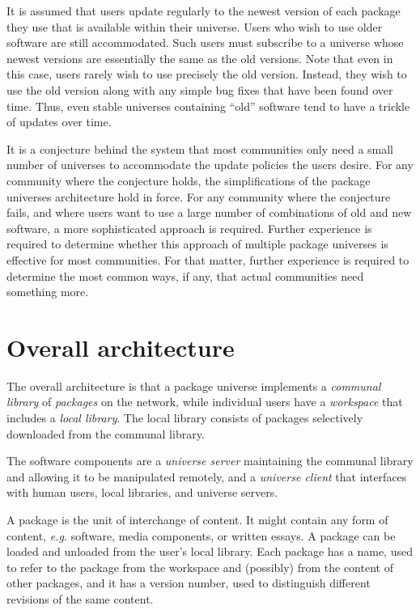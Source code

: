 \documentclass{article}
\newcommand{\eg}{\mbox{\emph{e.g.}}}
\begin{document}
It is assumed that users update regularly to the newest version of
each package they use that is available within their universe.  Users
who wish to use older software are still accommodated.  Such users must
subscribe to a universe whose newest versions are essentially the same
as the old versions.  Note that even in this case, users rarely wish
to use precisely the old version.  Instead, they wish to use the old
version along with any simple bug fixes that have been found over
time.  Thus, even stable universes containing ``old'' software tend to
have a trickle of updates over time.

It is a conjecture behind the system that most communities only need a
small number of universes to accommodate the update policies the users
desire.  For any community where the conjecture holds, the
simplifications of the package universes architecture hold in force.
For any community where the conjecture fails, and where users want to
use a large number of combinations of old and new software, a more
sophisticated approach is required.  Further experience is required to
determine whether this approach of multiple package universes is
effective for most communities.  For that matter, further experience
is required to determine the most common ways, if any, that actual
communities need something more.


\section{Overall architecture}
The overall architecture is that a package universe implements a
\emph{communal library} of \emph{packages} on the network, while
individual users have a \emph{workspace} that includes a \emph{local
library}.  The local library consists of packages selectively
downloaded from the communal library.

The software components are a \emph{universe server} maintaining the
communal library and allowing it to be manipulated remotely, and a
\emph{universe client} that interfaces with human users, local
libraries, and universe servers.

A package is the unit of interchange of content.  It might contain any
form of content, {\eg} software, media components, or written essays.
A package can be loaded and unloaded from the user's local library.
Each package has a name, used to refer to the package from the
workspace and (possibly) from the content of other packages, and it
has a version number, used to distinguish different revisions of the
same content.
\end{document}

